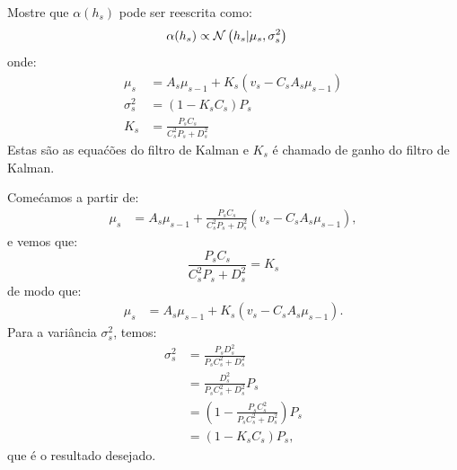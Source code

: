\begin{exenumerate}
    \item Mostre que $\alpha(h_s)$ pode ser reescrita como:
    \begin{align}
        \alpha(h_s) & \propto \mathcal{N}\left(h_s | \mu_s , \sigma_s^2\right)
    \end{align}
    onde:
    \begin{align}
        \mu_s & = A_s \mu_{s-1} + K_s \left(v_s - C_s A_s \mu_{s-1}\right) \label{eq:mu-def-alt}\\
        \sigma_s^2 & = (1-K_sC_s)P_s\\
        K_s & = \frac{P_s C_s}{C_s^2 P_s + D_s^2}
    \end{align}
    Estas s\~ao as equa\'c\~oes do filtro de Kalman e $K_s$ \'e chamado de ganho do filtro de Kalman.
    
    \begin{solution}
        Come\'camos a partir de:
        \begin{align}
            \mu_s & = A_s \mu_{s-1} + \frac{P_sC_s}{C_s^2 P_s+ D_s^2}\left(v_s - C_s A_s \mu_{s-1}\right),
        \end{align}
        e vemos que:
        \begin{equation}
            \frac{P_sC_s}{C_s^2 P_s+ D_s^2} = K_s
        \end{equation}
        de modo que:
        \begin{align}
            \mu_s & = A_s \mu_{s-1} + K_s \left(v_s - C_s A_s \mu_{s-1}\right).
        \end{align}
        Para a vari\^ancia $\sigma_s^2$, temos:
        \begin{align}
            \sigma^2_s  & =  \frac{P_s D_s^2}{P_s C_s^2+ D_s^2}\\
            & =\frac{D_s^2}{P_s C_s^2+ D_s^2}  P_s \\
            & = \left(1- \frac{P_sC_s^2}{P_s C_s^2+ D_s^2}\right) P_s\\
            & = (1- K_s C_s) P_s,
        \end{align}
        que \'e o resultado desejado.
        

\end{solution}
\end{exenumerate}
